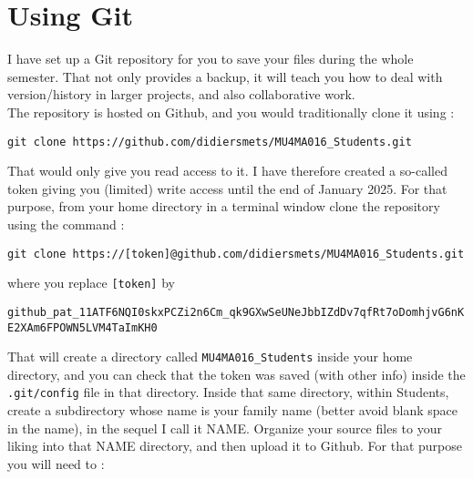 \documentclass[a4paper,12pt]{article}
\begin{document}
\section{Using Git}
I have set up a Git repository for you to save your files during the whole
semester. That not only provides a backup, it will teach you how to deal with
version/history in larger projects, and also collaborative work.\\
The repository is hosted on Github, and you would traditionally clone it
using :
\begin{center}
{\tt git clone https://github.com/didiersmets/MU4MA016\_Students.git} 
\end{center}
That would only give you read access to it. I have therefore created a so-called token 
giving you (limited) write access until the end of January 2025. For that purpose, from 
your home directory in a terminal window clone the repository using 
the command :
\begin{center}
	{\tt git clone https://[token]@github.com/didiersmets/MU4MA016\_Students.git} 
\end{center}
where you replace {\tt [token]} by 
\begin{center}
	{\tt \scriptsize github\_pat\_11ATF6NQI0skxPCZi2n6Cm\_qk9GXwSeUNeJbbIZdDv7qfRt7oDomhjvG6nKE2XAm6FPOWN5LVM4TaImKH0}
\end{center}
That will create a directory called {\tt MU4MA016\_Students} inside your home
directory, and you can check that the token was saved (with other info) 
inside the {\tt .git/config} file in that directory. Inside that same directory, 
within Students, create a subdirectory whose name is your family name (better avoid blank space 
in the name), in the sequel I call it NAME. Organize your source files to your 
liking into that NAME directory, and then upload it to Github. For that purpose 
you will need to :
\end{document}
